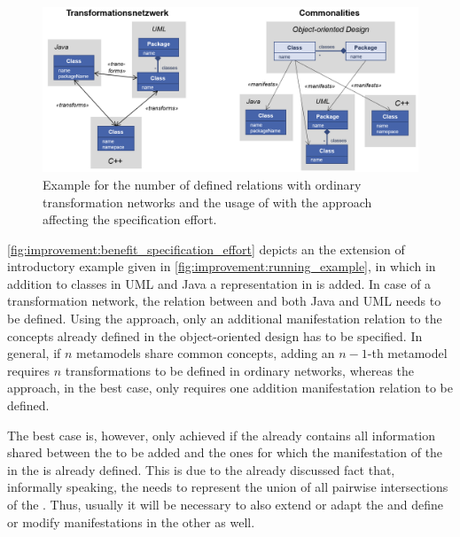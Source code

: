\begin{figure}
    \centering
    \includegraphics[width=\textwidth]{figures/quality/improvement/benefit_specification_effort.png}
    \caption[Benefit of \commonalities regarding specification effort]{Example for the number of defined relations with ordinary transformation networks and the usage of \conceptmetamodels with the \commonalities approach affecting the specification effort.}
    \label{fig:improvement:benefit_specification_effort}
\end{figure}

\autoref{fig:improvement:benefit_specification_effort} depicts an the extension of introductory example given in \autoref{fig:improvement:running_example}, in which in addition to classes in \gls{UML} and Java a representation in \cplusplus is added.
In case of a transformation network, the relation between \cplusplus and both Java and \gls{UML} needs to be defined.
Using the \commonalities approach, only an additional manifestation relation to the concepts already defined in the object-oriented design \conceptmetamodels has to be specified.
In general, if $n$ metamodels share common concepts, adding an $n-1$-th metamodel requires $n$ transformations to be defined in ordinary networks, whereas the \commonalities approach, in the best case, only requires one addition manifestation relation to be defined.

The best case is, however, only achieved if the \conceptmetamodel already contains all information shared between the \concretemetamodel to be added and the ones for which the manifestation of the \commonalities in the \conceptmetamodel is already defined.
This is due to the already discussed fact that, informally speaking, the \conceptmetamodel needs to represent the union of all pairwise intersections of the \concretemetamodels.
Thus, usually it will be necessary to also extend or adapt the \conceptmetamodel and define or modify manifestations in the other \concretemetamodels as well.

